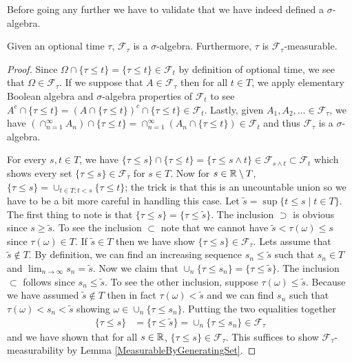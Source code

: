 Before going any further we have to validate that we have indeed
defined a $\sigma$-algebra.
\begin{lem}\label{StoppedFiltration}Given an optional time $\tau$, $\mathcal{F}_\tau$ is a
  $\sigma$-algebra.  Furthermore, $\tau$ is $\mathcal{F}_\tau$-measurable.
\end{lem}
\begin{proof}Since $\Omega \cap \lbrace \tau \leq t \rbrace  = \lbrace
  \tau \leq t \rbrace \in \mathcal{F}_t$ by definition of optional
  time, we see that $\Omega \in \mathcal{F}_\tau$.  If we suppose that
  $A \in \mathcal{F}_\tau$ then for all $t \in T$, we apply elementary
  Boolean  algebra and $\sigma$-algebra properties of $\mathcal{F}_t$ to see $A^c \cap \lbrace
  \tau \leq t \rbrace = (A \cap \lbrace
  \tau \leq t \rbrace)^c \cap \lbrace
  \tau \leq t \rbrace \in \mathcal{F}_t$.  Lastly, given $A_1, A_2,
  \dots \in \mathcal{F}_\tau$, we have $(\cap_{n=1}^\infty A_n)
  \cap \lbrace
  \tau \leq t \rbrace = \cap_{n=1}^\infty (A_n
  \cap \lbrace
  \tau \leq t \rbrace ) \in \mathcal{F}_t$ and thus $\mathcal{F}_\tau$
  is a $\sigma$-algebra.

For every $s,t \in T$, we have 
$\lbrace \tau \leq s \rbrace \cap \lbrace \tau \leq t \rbrace =
\lbrace \tau \leq s \wedge t \rbrace \in \mathcal{F}_{s \wedge t}
\subset \mathcal{F}_t$ which shows every set $\lbrace \tau \leq s
\rbrace \in \mathcal{F}_\tau$ for $s \in T$.  Now for $s \in \mathbb{R}
\setminus T$,
$\lbrace \tau \leq s \rbrace = \cup_{t \in T ; t < s} \lbrace \tau
\leq t \rbrace$; the trick is that this is an uncountable
union so we have to be a bit more careful in handling this
case.  Let $\tilde{s} = \sup \lbrace t \leq s \mid t \in T \rbrace$.  The
first thing to note is that $\lbrace \tau \leq s \rbrace = \lbrace
\tau \leq \tilde{s} \rbrace$.  The inclusion $\supset$ is obvious
since $s \geq \tilde{s}$.  To see the inclusion $\subset$ note that we
cannot have $\tilde{s} < \tau(\omega) \leq s$ since $\tau(\omega) \in
T$.  If $\tilde{s} \in T$ then we have show $\lbrace \tau \leq s
\rbrace \in \mathcal{F}_\tau$.  Lets assume that $\tilde{s} \notin T$.
By definition, we can find an increasing sequence $s_n \leq \tilde{s}$
such that $s_n \in T$ and $\lim_{n
  \to \infty} s_n = \tilde{s}$.  Now we claim that $\cup_n \lbrace \tau \leq
s_n \rbrace = \lbrace \tau \leq \tilde{s} \rbrace$.  The inclusion
$\subset$ follows since $s_n \leq \tilde{s}$.  To see the other
inclusion, suppose $\tau(\omega) \leq \tilde{s}$.  Because we have
assumed $\tilde{s} \notin T$ then in fact $\tau(\omega) < \tilde{s}$
and we can find $s_n$ such that $\tau(\omega) < s_n < \tilde{s}$
showing $\omega \in \cup_n \lbrace \tau \leq
s_n \rbrace$.  Putting the two equalities together
\begin{align*}
\lbrace \tau \leq s \rbrace &= \lbrace \tau \leq \tilde{s} \rbrace =
\cup_n \lbrace \tau \leq s_n \rbrace \in \mathcal{F}_\tau
\end{align*}
and we have shown that for all $s \in \mathbb{R}$, $\lbrace \tau \leq s
\rbrace \in \mathcal{F}_\tau$.
This suffices to show $\mathcal{F}_\tau$-measurability by Lemma \ref{MeasurableByGeneratingSet}.
\end{proof}

